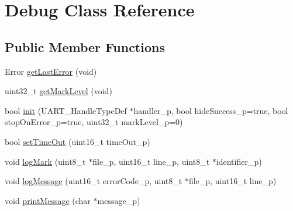 \hypertarget{class_debug}{}\section{Debug Class Reference}
\label{class_debug}
\subsection*{Public Member Functions}
\begin{DoxyCompactItemize}
\item 
Error \hyperlink{class_debug_adb93838d76af88c237258cd00aedfe80}{get\+Last\+Error} (void)
\item 
uint32\+\_\+t \hyperlink{class_debug_a60fbbe4c199b56dfae68e7526d91b3f5}{get\+Mark\+Level} (void)
\item 
bool \hyperlink{class_debug_abfb75d6b7e3bd6d85d913da76947e380}{init} (U\+A\+R\+T\+\_\+\+Handle\+Type\+Def $\ast$handler\+\_\+p, bool hide\+Success\+\_\+p=true, bool stop\+On\+Error\+\_\+p=true, uint32\+\_\+t mark\+Level\+\_\+p=0)
\item 
bool \hyperlink{class_debug_a04f4e373b5d3394f74e9d49ace127213}{set\+Time\+Out} (uint16\+\_\+t time\+Out\+\_\+p)
\item 
void \hyperlink{class_debug_a6b46a015817a6390299343c02e87feb5}{log\+Mark} (uint8\+\_\+t $\ast$file\+\_\+p, uint16\+\_\+t line\+\_\+p, uint8\+\_\+t $\ast$identifier\+\_\+p)
\item 
void \hyperlink{class_debug_afea3e51b37deb4a9526b5b69147d37f0}{log\+Message} (uint16\+\_\+t error\+Code\+\_\+p, uint8\+\_\+t $\ast$file\+\_\+p, uint16\+\_\+t line\+\_\+p)
\item 
void \hyperlink{class_debug_ab7fd4df22274d1bdf633e3ddeeb010ca}{print\+Message} (char $\ast$message\+\_\+p)
\end{DoxyCompactItemize}
